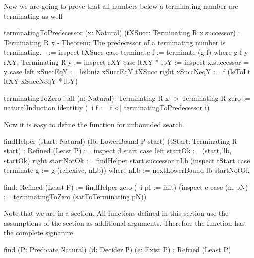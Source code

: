 Now we are going to prove that all numbers below a terminating number are
terminating as well.
%
\begin{alba}
    terminatingToPredecessor
        (x: Natural)
        (tXSucc: Terminating R x.successor)
        : Terminating R x
    {- Theorem: The predecessor of a terminating number is terminating. -}
    :=
        inspect tXSucc case
            terminate f :=
                terminate (g f)
        where
            g f y rXY: Terminating R y :=
                inspect rXY case
                    ltXY * lbY :=
                        inspect x.successor = y case
                            left xSuccEqY :=
                                leibniz xSuccEqY tXSucc
                            right xSuccNeqY :=
                                f (leToLt ltXY xSuccNeqY * lbY)

    terminatingToZero
        : all (n: Natural): Terminating R x -> Terminating R zero
    :=
        naturalInduction
            identitiy
            (\ i f := f <| terminatingToPredecessor i)
\end{alba}

Now it is easy to define the function for unbounded search.

\begin{alba}
    findHelper
        (start: Natural)
        (lb: LowerBound P start)
        (tStart: Terminating R start)
        : Refined (Least P)
    :=
        inspect d start case
            left startOk :=
                (start, lb, startOk)
            right startNotOk :=
                findHelper
                    start.successor
                    nLb
                    (inspect tStart case
                        terminate g :=
                            g (reflexive, nLb))
                where
                    nLb := nextLowerBound lb startNotOk

    find: Refined (Least P) :=
        findHelper
            zero
            (\ i pI := init)
            (inspect e case
                (n, pN) :=
                    terminatingToZero (satToTerminating pN))
\end{alba}

Note that we are in a section. All functions defined in this section use the
assumptions of the section as additional arguments. Therefore the function
 has the complete signature
%
\begin{alba}
    find
        (P: Predicate Natural) (d: Decider P) (e: Exist P)
        : Refined (Least P)
\end{alba}







